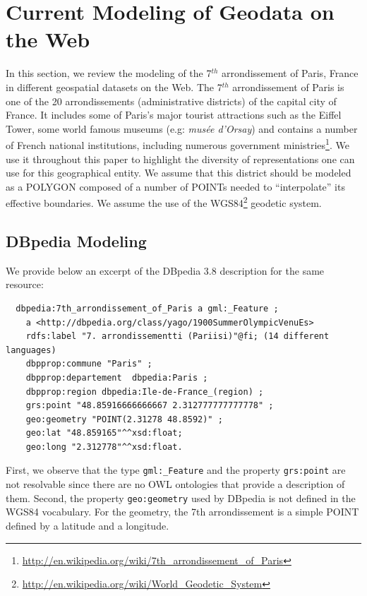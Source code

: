 \section{Current Modeling of Geodata on the Web}\label{sec:scenario}
In this section, we review the modeling of the 7$^{th}$ arrondissement of Paris, France in different geospatial datasets on the Web. The 7$^{th}$ arrondissement of Paris is one of the 20 arrondissements (administrative districts) of the capital city of France. It includes some of Paris's major tourist attractions such as the Eiffel Tower, some world famous museums (e.g: \textit{mus\'{e}e d'Orsay}) and contains a number of French national institutions, including numerous government ministries\footnote{\url{http://en.wikipedia.org/wiki/7th_arrondissement_of_Paris}}. We use it throughout this paper to highlight the diversity of representations one can use for this geographical entity. We assume that this district should be modeled as a POLYGON composed of a number of POINTs needed to ``interpolate'' its effective boundaries. We assume the use of the WGS84\footnote{\url{http://en.wikipedia.org/wiki/World_Geodetic_System}} geodetic system.


\subsection{DBpedia Modeling}
We provide below an excerpt of the DBpedia 3.8 description for the same resource:
{\small
\begin{verbatim}
  dbpedia:7th_arrondissement_of_Paris a gml:_Feature ;
    a <http://dbpedia.org/class/yago/1900SummerOlympicVenuEs>
    rdfs:label "7. arrondissementti (Pariisi)"@fi; (14 different languages)
    dbpprop:commune "Paris" ;
    dbpprop:departement  dbpedia:Paris ;
    dbpprop:region dbpedia:Ile-de-France_(region) ;
    grs:point "48.85916666666667 2.312777777777778" ;
    geo:geometry "POINT(2.31278 48.8592)" ;
    geo:lat "48.859165"^^xsd:float;
    geo:long "2.312778"^^xsd:float.
\end{verbatim}
}
First, we observe that the type \texttt{gml:\_Feature} and the property \texttt{grs:point} are not resolvable since there are no OWL ontologies that provide a description of them. Second, the property \texttt{geo:geometry} used by DBpedia is not defined in the WGS84 vocabulary. For the geometry, the 7th arrondissement is a simple POINT defined by a latitude and a longitude.


